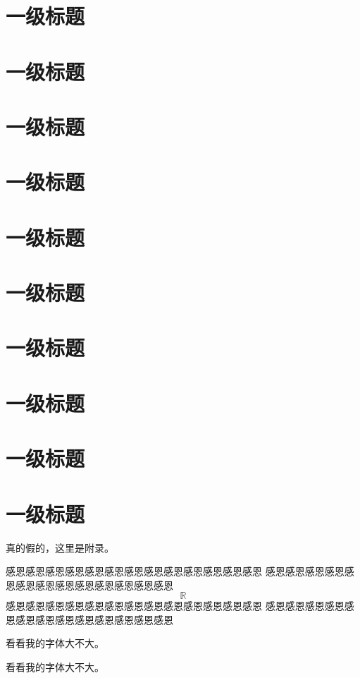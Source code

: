 \documentclass[printMode]{ecnuthesis}
\begin{document}
\chapter{一级标题}
\chapter{一级标题}
\chapter{一级标题}
\chapter{一级标题}
\chapter{一级标题}
\chapter{一级标题}
\chapter{一级标题}
\chapter{一级标题}
\chapter{一级标题}
\chapter{一级标题}



\begin{appendix}
  真的假的，这里是附录。
\end{appendix}


\begin{acknowledgement}
  感恩感恩感恩感恩感恩感恩感恩感恩感恩感恩感恩感恩感恩
  感恩感恩感恩感恩感恩感恩感恩感恩感恩感恩感恩感恩感恩
  \[ \mathbb{R} \]
  感恩感恩感恩感恩感恩感恩感恩感恩感恩感恩感恩感恩感恩
  感恩感恩感恩感恩感恩感恩感恩感恩感恩感恩感恩感恩感恩
\end{acknowledgement}

看看我的字体大不大。

{\normalsize 看看我的字体大不大。}
\end{document}

